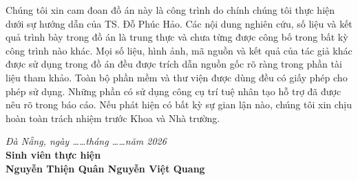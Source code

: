 Chúng tôi xin cam đoan đồ án này là công trình do chính chúng tôi thực hiện dưới sự hướng dẫn của TS. Đỗ Phúc Hảo. Các nội dung nghiên cứu, số liệu và kết quả trình bày trong đồ án là trung thực và chưa từng được công bố trong bất kỳ công trình nào khác.
Mọi số liệu, hình ảnh, mã nguồn và kết quả của tác giả khác được sử dụng trong đồ án đều được trích dẫn nguồn gốc rõ ràng trong phần tài liệu tham khảo. Toàn bộ phần mềm và thư viện được dùng đều có giấy phép cho phép sử dụng. Những phần có sử dụng công cụ trí tuệ nhân tạo hỗ trợ đã được nêu rõ trong báo cáo.
Nếu phát hiện có bất kỳ sự gian lận nào, chúng tôi xin chịu hoàn toàn trách nhiệm trước Khoa và Nhà trường.
\vspace{1.5cm}
\begin{flushright}
\textit{Đà Nẵng, ngày \dots\dots tháng \dots\dots năm 2026}\\[0.3cm]
\textbf{Sinh viên thực hiện}\\[2cm]
\textbf{Nguyễn Thiện Quân \hspace{1.5cm} Nguyễn Việt Quang}
\end{flushright}
